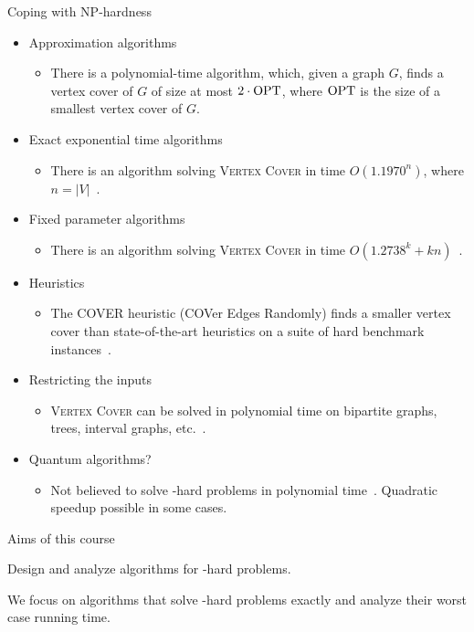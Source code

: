 \begin{frame}{Coping with NP-hardness}
	\begin{itemize}
		\item Approximation algorithms
		      \begin{itemize}
			      \item There is a polynomial-time algorithm, which, given a graph $G$, finds a vertex cover of $G$ of size at most $2\cdot \text{\normalfont OPT}$, where $\text{\normalfont OPT}$ is the size of a smallest vertex cover of $G$.
		      \end{itemize}
		\item Exact exponential time algorithms
		      \begin{itemize}
			      \item There is an algorithm solving \textsc{Vertex Cover} in time $O(1.1970^n)$, where $n=|V|$~\cite{XiaoN17}.
		      \end{itemize}
		\item Fixed parameter algorithms
		      \begin{itemize}
			      \item There is an algorithm solving \textsc{Vertex Cover} in time $O(1.2738^k+kn)$~\cite{ChenKX10}.
		      \end{itemize}
		\item Heuristics
		      \begin{itemize}
			      \item The COVER heuristic (COVer Edges Randomly) finds a smaller vertex cover than state-of-the-art heuristics on a suite of hard benchmark instances~\cite{RichterHG07}.
		      \end{itemize}
		\item Restricting the inputs
		      \begin{itemize}
			      \item \textsc{Vertex Cover} can be solved in polynomial time on bipartite graphs, trees, interval graphs, etc.~\cite{Golumbic04}.
		      \end{itemize}
		\item Quantum algorithms?
		      \begin{itemize}
			      \item Not believed to solve \NP-hard problems in polynomial time~\cite{Aaronson05}. Quadratic speedup possible in some cases.
		      \end{itemize}
	\end{itemize}
\end{frame}

\begin{frame}{Aims of this course}

	\centering
	Design and analyze algorithms for \NP-hard problems.

	\bigskip

	\centering
	We focus on algorithms that solve \NP-hard problems \alert{exactly} and analyze their \alert{worst case running time}.
\end{frame}

